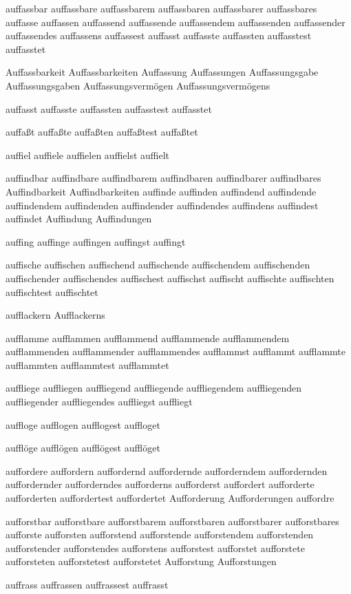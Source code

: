 auffassbar auffassbare auffassbarem auffassbaren auffassbarer auffassbares auffasse auffassen auffassend auffassende auffassendem auffassenden auffassender auffassendes auffassens auffassest auffasst auffasste auffassten auffasstest auffasstet 

Auffassbarkeit Auffassbarkeiten Auffassung Auffassungen Auffassungsgabe Auffassungsgaben Auffassungsvermögen Auffassungsvermögens

auffasst auffasste auffassten auffasstest auffasstet

auffaßt auffaßte auffaßten auffaßtest auffaßtet

auffiel auffiele auffielen auffielst auffielt

auffindbar auffindbare auffindbarem auffindbaren auffindbarer auffindbares Auffindbarkeit Auffindbarkeiten auffinde auffinden auffindend auffindende auffindendem auffindenden auffindender auffindendes auffindens auffindest auffindet Auffindung Auffindungen

auffing auffinge auffingen auffingst auffingt

auffische auffischen auffischend auffischende auffischendem auffischenden auffischender auffischendes auffischest auffischst auffischt auffischte auffischten auffischtest auffischtet

aufflackern Aufflackerns

aufflamme aufflammen aufflammend aufflammende aufflammendem aufflammenden aufflammender aufflammendes aufflammst aufflammt aufflammte aufflammten aufflammtest aufflammtet

auffliege auffliegen auffliegend auffliegende auffliegendem auffliegenden auffliegender auffliegendes auffliegst auffliegt

auffloge aufflogen aufflogest auffloget

aufflöge aufflögen aufflögest aufflöget

auffordere auffordern auffordernd auffordernde aufforderndem auffordernden auffordernder aufforderndes aufforderns aufforderst auffordert aufforderte aufforderten auffordertest auffordertet Aufforderung Aufforderungen auffordre

aufforstbar aufforstbare aufforstbarem aufforstbaren aufforstbarer aufforstbares aufforste aufforsten aufforstend aufforstende aufforstendem aufforstenden aufforstender aufforstendes aufforstens aufforstest aufforstet aufforstete aufforsteten aufforstetest aufforstetet Aufforstung Aufforstungen

auffrass auffrassen auffrassest auffrasst

